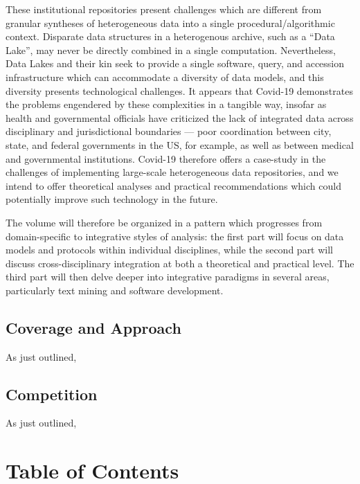 \documentclass{statsoc}
\newcommand{\p}[1]{

\vspace{.75em}#1}
\newcommand{\q}[1]{{\fontfamily{qcr}\selectfont ``}#1{\fontfamily{qcr}\selectfont ''}}
\begin{document}
{\p{These institutional repositories present 
challenges which are different from granular 
syntheses of heterogeneous data into a single 
procedural/algorithmic context.  Disparate data structures 
in a heterogenous archive, such as a \q{Data Lake}, may 
never be directly combined in a single computation.  
Nevertheless, Data Lakes and their kin seek to 
provide a single software, query, and accession infrastructure 
which can accommodate a diversity of data models, and 
this diversity presents technological challenges.  
It appears that Covid-19 demonstrates the problems 
engendered by these complexities in a tangible way, 
insofar as health and governmental officials have criticized 
the lack of integrated data across disciplinary and 
jurisdictional boundaries --- poor coordination between 
city, state, and federal governments in the US, for 
example, as well as between medical and governmental institutions.  
Covid-19 therefore offers a case-study in the challenges 
of implementing large-scale heterogeneous data repositories, 
and we intend to offer theoretical analyses and practical 
recommendations which could potentially improve such 
technology in the future.} 

\p{The volume will therefore be organized in a pattern 
which progresses from domain-specific to integrative 
styles of analysis: the first part will focus on data 
models and protocols within individual disciplines, 
while the second part will discuss 
cross-disciplinary integration at both a theoretical and 
practical level.  The third part will then delve deeper 
into integrative paradigms in several areas, particularly 
text mining and software development.}  

\subsection{Coverage and Approach}

\p{As just outlined,  }


\subsection{Competition}

\p{As just outlined,  }


\section{Table of Contents}

\begin{description}


\end{description}}
\end{document}
